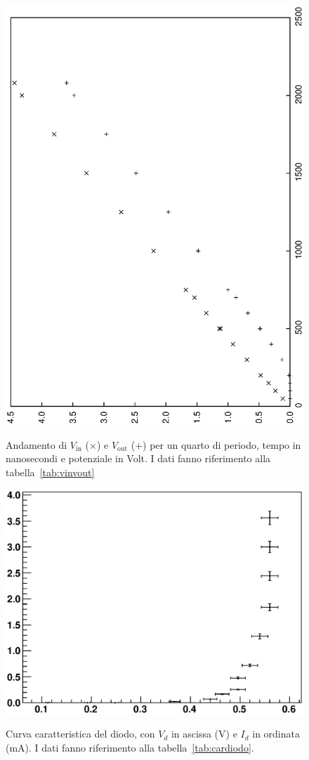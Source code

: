 \documentclass[italian,a4paper]{article}
\begin{document}
\begin{figure}[p]\caption{Andamento di $V_\text{in}$ ($\times$) e
    $V_\text{out}$ ($+$) per un quarto di periodo, tempo in nanosecondi e
    potenziale in Volt. I dati fanno riferimento alla
    tabella~\ref{tab:vinvout}} 
    \centering
    \includegraphics[angle=-90,width=\textwidth]{diodo.ps}\label{fig:vinvout}
\end{figure}
\begin{figure}[p]\caption{Curva caratteristica del diodo, con $V_d$ in
    ascissa (V) e $I_d$ in ordinata (\unit{mA}). I dati fanno riferimento
    alla tabella~\ref{tab:cardiodo}.} 
    \centering
    \includegraphics[width=\textwidth]{car.eps}\label{fig:cardiodo}
\end{figure}
\end{document}
